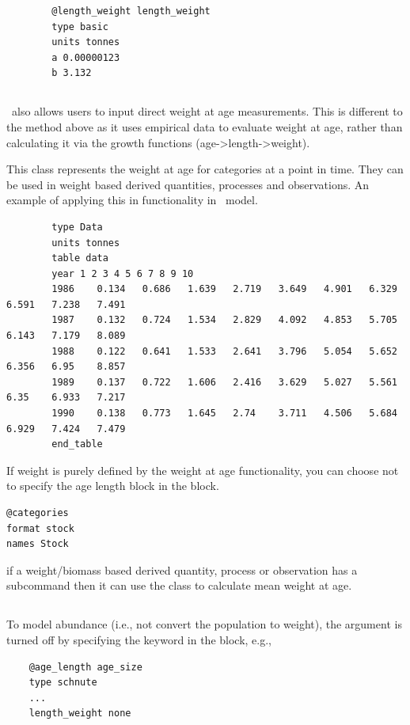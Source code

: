 {\small{\begin{verbatim}
		@length_weight length_weight
		type basic
		units tonnes
		a 0.00000123
		b 3.132
\end{verbatim}}}

\subsection{\label{sec:weight-at-age}}

\CNAME\ also allows users to input direct weight at age measurements. This is different to the method above as it uses empirical data to evaluate weight at age, rather than calculating it via the growth functions (age->length->weight).

This class represents the weight at age for categories at a point in time. They can be used in weight based derived quantities, processes and observations. An example of applying this in functionality in \CNAME\ model.

{\small{\begin{verbatim}
		type Data
		units tonnes
		table data
		year 1 2 3 4 5 6 7 8 9 10
		1986	0.134	0.686	1.639	2.719	3.649	4.901	6.329	6.591	7.238	7.491
		1987	0.132	0.724	1.534	2.829	4.092	4.853	5.705	6.143	7.179	8.089
		1988	0.122	0.641	1.533	2.641	3.796	5.054	5.652	6.356	6.95	8.857
		1989	0.137	0.722	1.606	2.416	3.629	5.027	5.561	6.35	6.933	7.217
		1990	0.138	0.773	1.645	2.74	3.711	4.506	5.684	6.929	7.424	7.479
		end_table
		\end{verbatim}}}

If weight is purely defined by the weight at age functionality, you can choose not to specify the age length block in the  block.

{\small{\begin{verbatim}
@categories
format stock
names Stock
\end{verbatim}}}

if a weight/biomass based derived quantity, process or observation has a  subcommand then it can use the  class to calculate mean weight at age.

\subsection{\label{sec:weightless-model}}

To model abundance (i.e., not convert the population to weight), the  argument is turned off by specifying the keyword  in the  block, e.g.,
{\small{\begin{verbatim}
	@age_length age_size
	type schnute
	...
	length_weight none
	\end{verbatim}}}

